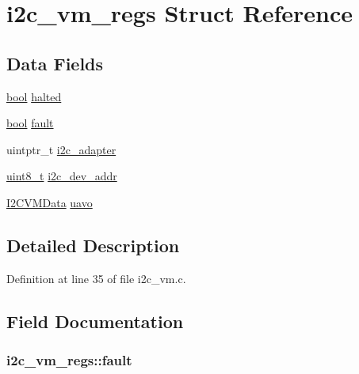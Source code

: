 \hypertarget{structi2c__vm__regs}{\section{i2c\-\_\-vm\-\_\-regs Struct Reference}
\label{structi2c__vm__regs}
}
\subsection*{Data Fields}
\begin{DoxyCompactItemize}
\item 
\hyperlink{group___exported__types_gaf6a258d8f3ee5206d682d799316314b1}{bool} \hyperlink{structi2c__vm__regs_aa3c803fa05ab57a838ae6b617d34482e}{halted}
\item 
\hyperlink{group___exported__types_gaf6a258d8f3ee5206d682d799316314b1}{bool} \hyperlink{structi2c__vm__regs_ae7015bac5741e377b8bcb8b2d8df9e82}{fault}
\item 
uintptr\-\_\-t \hyperlink{structi2c__vm__regs_a70b3400858879a31d7a1a032f6b2807e}{i2c\-\_\-adapter}
\item 
\hyperlink{stdint_8h_aba7bc1797add20fe3efdf37ced1182c5}{uint8\-\_\-t} \hyperlink{structi2c__vm__regs_a3f919c5ae80615db316bec29bd0d1156}{i2c\-\_\-dev\-\_\-addr}
\item 
\hyperlink{struct_i2_c_v_m_data}{I2\-C\-V\-M\-Data} \hyperlink{structi2c__vm__regs_a7c478bf7f2b9d2dc1501e92e1368b69e}{uavo}
\end{DoxyCompactItemize}


\subsection{Detailed Description}


Definition at line 35 of file i2c\-\_\-vm.\-c.



\subsection{Field Documentation}
\hypertarget{structi2c__vm__regs_ae7015bac5741e377b8bcb8b2d8df9e82}{
\subsubsection[{fault}]{ i2c\-\_\-vm\-\_\-regs\-::fault}}\label{structi2c__vm__regs_ae7015bac5741e377b8bcb8b2d8df9e82}


